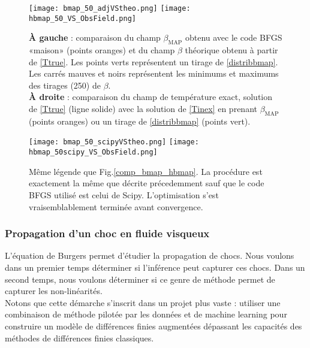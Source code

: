 \documentclass[a4paper,12pt]{article}
\newcommand{\bmap}{\beta_{\text{MAP}}}
\newcommand\bk{\color{black}}
\newcommand\dsb{\color{dsb}}
\numberwithin{equation}{section} %
\begin{document}
\begin{figure}[!ht]
\centering
\texttt{[image: bmap\_50\_adjVStheo.png]} \hfill
\texttt{[image: hbmap\_50\_VS\_ObsField.png]}
\caption{\small{\textbf{À gauche} : comparaison du champ $\bmap$ obtenu avec le code BFGS «maison» (points oranges) et du champ $\beta$ théorique obtenu à partir de \eqref{Ttrue}. Les points verts représentent un tirage de \eqref{distribbmap}. Les carrés mauves et noirs représentent les minimums et maximums des tirages (250) de $\beta$. \\ \textbf{À droite} : comparaison du champ de température exact, solution de \eqref{Ttrue} (ligne solide) avec la solution de \eqref{Tinex} en prenant $\bmap$ (points oranges) ou un tirage de \eqref{distribbmap} (points vert).}}
\label{comp_bmap_hbmap}
\end{figure}

\begin{figure}[!ht]
\centering
\texttt{[image: bmap\_50\_scipyVStheo.png]} \hfill
\texttt{[image: hbmap\_50scipy\_VS\_ObsField.png]}
\caption{\small{Même légende que Fig.\eqref{comp_bmap_hbmap}. La procédure est exactement la même que décrite précedemment sauf que le code BFGS utilisé est celui de Scipy. L'optimisation s'est vraisemblablement terminée avant convergence.}}
\label{scipycomp_bmap_hbmap}
\end{figure}

\dsb \subsubsection{Propagation d'un choc en fluide visqueux} \bk
\noindent L'équation de Burgers permet d'étudier la propagation de chocs. Nous voulons dans un premier temps déterminer si l'inférence peut capturer ces chocs. Dans un second temps, nous voulons déterminer si ce genre de méthode permet de capturer les non-linéarités. \\
Notons que cette démarche s'inscrit dans un projet plus vaste : utiliser une combinaison de méthode pilotée par les données et de machine learning pour construire un modèle de différences finies augmentées dépassant les capacités des méthodes de différences finies classiques.\\
\end{document}
